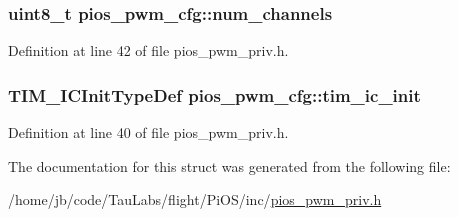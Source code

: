 \hypertarget{structpios__pwm__cfg_acf9d41bfa9ce5ee489fcb27a98605e5c}{
\subsubsection[{num\-\_\-channels}]{\setlength{\rightskip}{0pt plus 5cm}uint8\-\_\-t {\bf pios\-\_\-pwm\-\_\-cfg\-::num\-\_\-channels}}}\label{structpios__pwm__cfg_acf9d41bfa9ce5ee489fcb27a98605e5c}


\-Definition at line 42 of file pios\-\_\-pwm\-\_\-priv.\-h.

\hypertarget{structpios__pwm__cfg_a7f64d325db8aca0d737d94648b079b36}{
\subsubsection[{tim\-\_\-ic\-\_\-init}]{\setlength{\rightskip}{0pt plus 5cm}\-T\-I\-M\-\_\-\-I\-C\-Init\-Type\-Def {\bf pios\-\_\-pwm\-\_\-cfg\-::tim\-\_\-ic\-\_\-init}}}\label{structpios__pwm__cfg_a7f64d325db8aca0d737d94648b079b36}


\-Definition at line 40 of file pios\-\_\-pwm\-\_\-priv.\-h.



\-The documentation for this struct was generated from the following file\-:\begin{DoxyCompactItemize}
\item 
/home/jb/code/\-Tau\-Labs/flight/\-Pi\-O\-S/inc/\hyperlink{pios__pwm__priv_8h}{pios\-\_\-pwm\-\_\-priv.\-h}\end{DoxyCompactItemize}
